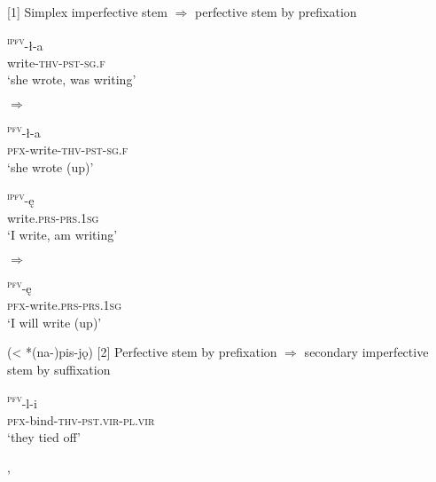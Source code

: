 \documentclass[output=paper]{langscibook}
\begin{document}
\ea \label{ex:wiemer:3} 
{[1] Simplex imperfective stem ${\Rightarrow}$ perfective stem by prefixation}\\
\ea \label{ex:wiemer:3a}\begin{minipage}[t]{\widthof{‘she wrote, was writing’~~~}}
    \gll [{pis-a}]\textsc{\textsuperscript{ipfv}}{{}-ł-a}\\ 
         write-\textsc{thv-pst-sg.f}\\                                    
    \glt ‘she wrote, was writing’\end{minipage}  ${\Rightarrow}$ \hspace{1ex}
    \begin{minipage}[t]{.4\linewidth}
    \gll [{na-pis-a}]\textsc{\textsuperscript{pfv}}{-ł-a} \\
              \textsc{pfx}{}-write-\textsc{thv-pst-sg.f}\\                
     \glt ‘she wrote (up)’\end{minipage}          
\ex \label{ex:wiemer:3b}\begin{minipage}[t]{\widthof{‘I write, am writing’~~~~}}
    \gll  [{pisz}]\textsc{\textsuperscript{ipfv}}{{}-ę}\\                         
    write.\textsc{prs-prs.1sg} \hphantom{text}\\                                                
    \glt     ‘I write, am writing’\end{minipage} ${\Rightarrow}$  \hspace{1ex}                
    \begin{minipage}[t]{\widthof{\textsc{pfx}{}-write.\textsc{prs-prs.1sg}~~}}   
    \gll [{na-pisz}]\textsc{\textsuperscript{pfv}}{{}-ę} \\ 
         \textsc{pfx}{}-write.\textsc{prs-prs.1sg}\\
  \glt ‘I will write (up)’\\ \end{minipage}  (< *{(na-)pis-jǫ})                                                 
\z \ex \label{ex:wiemer:4} 
{[2] Perfective stem by prefixation ${\Rightarrow}$  secondary imperfective stem by suffixation}\\
 \ea \label{ex:wiemer:4a}\begin{minipage}[t]{.4\textwidth}
\textsc{\textsuperscript{pfv}}{{}-l-i}\\         
     \textsc{pfx}{}-bind-\textsc{thv-pst.vir-pl.vir}\\           
\glt    ‘they tied off’    \end{minipage} ,  \hspace{1ex} 
\end{document}
